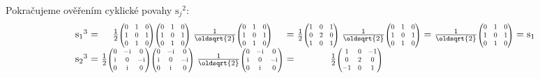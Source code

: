 \documentclass[10pt,a4paper]{article}
\newcommand{\const}[1]{\text{#1}}
\newcommand{\mat}[1]{
    \begin{pmatrix}
        #1
    \end{pmatrix}
}
\newcommand{\smat}[2][1]{
    \scalebox{#1}{$\mat{#2}$}
}
\renewcommand{\i}{\const{i}}
\begin{document}
Pokračujeme ověřením cyklické povahy ${\const{s}_j}^2$:
\begin{equation*}
    \def\={\hspace{-5pt}&\hspace{-2pt}=\hspace{-2pt}&\hspace{-5pt}}
    \begin{array}{rcccccccl}
        {\const{s}_1}^3
        \=
        \frac{1}{2} \smat[0.7]{
            0 & 1 & 0 \\
            1 & 0 & 1 \\
            0 & 1 & 0
        }
        \smat[0.7]{
            0 & 1 & 0 \\
            1 & 0 & 1 \\
            0 & 1 & 0
        }
        \;
        \frac{1}{\oldsqrt{2}} \smat[0.7]{
            0 & 1 & 0 \\
            1 & 0 & 1 \\
            0 & 1 & 0
        }
        \=
        \frac{1}{2} \smat[0.7]{
            1 & 0 & 1 \\
            0 & 2 & 0 \\
            1 & 0 & 1
        }
        \;
        \frac{1}{\oldsqrt{2}} \smat[0.7]{
            0 & 1 & 0 \\
            1 & 0 & 1 \\
            0 & 1 & 0
        }
        \=
        \frac{1}{\oldsqrt{2}} \smat[0.7]{
            0 & 1 & 0 \\
            1 & 0 & 1 \\
            0 & 1 & 0
        }
        \=
        \const{s}_1
        \\
        {\const{s}_2}^3
        \=
        \frac{1}{2} \smat[0.7]{
            0 & -\i & 0 \\
            \i & 0 & -\i \\
            0 & \i & 0
        }
        \smat[0.7]{
            0 & -\i & 0 \\
            \i & 0 & -\i \\
            0 & \i & 0
        }
        \;
        \frac{1}{\oldsqrt{2}} \smat[0.7]{
            0 & -\i & 0 \\
            \i & 0 & -\i \\
            0 & \i & 0
        }
        \=
        \frac{1}{2} \smat[0.7]{
            1 & 0 & -1 \\
            0 & 2 & 0 \\
            -1 & 0 & 1
        }

\end{array}
\end{equation*}
\end{document}
